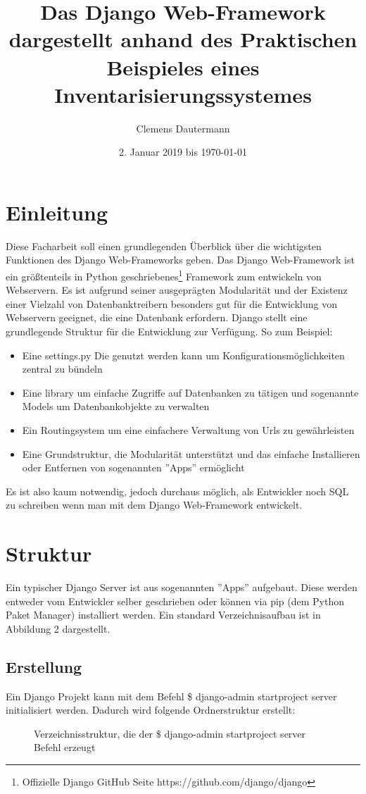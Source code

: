 \documentclass{article}
\title{Das Django Web-Framework dargestellt anhand des Praktischen Beispieles eines Inventarisierungssystemes}
\author{Clemens Dautermann}
\date{2. Januar 2019 bis \today}
\begin{document}
\maketitle
\newpage
\tableofcontents
\newpage


\section{Einleitung}
Diese Facharbeit soll einen grundlegenden Überblick über die wichtigsten Funktionen des Django Web-Frameworks geben.\newline
Das Django Web-Framework ist ein größtenteils in Python geschriebenes\footnote{Offizielle Django GitHub Seite https://github.com/django/django} Framework
zum entwickeln von Webservern. Es ist aufgrund seiner ausgeprägten Modularität und der Existenz einer Vielzahl von Datenbanktreibern besonders gut für
die Entwicklung von Webservern geeignet, die eine Datenbank erfordern.\newline 
Django stellt eine grundlegende Struktur für die Entwicklung zur Verfügung. So zum Beispiel:
\begin{itemize}
	\item Eine settings.py Die genutzt werden kann um Konfigurationsmöglichkeiten zentral zu bündeln
	\item Eine library um einfache Zugriffe auf Datenbanken zu tätigen und sogenannte Models um Datenbankobjekte zu verwalten
	\item Ein Routingsystem um eine einfachere Verwaltung von Urls zu gewährleisten
	\item Eine Grundstruktur, die Modularität unterstützt und das einfache Installieren oder Entfernen von sogenannten ''Apps'' ermöglicht
\end{itemize}
Es ist also kaum notwendig, jedoch durchaus möglich, als Entwickler noch SQL zu schreiben wenn man mit dem Django Web-Framework entwickelt.

\section{Struktur}
Ein typischer Django Server ist aus sogenannten ''Apps'' aufgebaut. Diese werden entweder vom Entwickler selber geschrieben oder können via pip (dem Python Paket Manager) installiert werden. Ein standard Verzeichnisaufbau ist in Abbildung 2 dargestellt.
\subsection{Erstellung}
Ein Django Projekt kann mit dem Befehl \$ django-admin startproject server initialisiert werden. Dadurch wird folgende Ordnerstruktur erstellt:
\begin{figure}[H]
\caption{Verzeichnisstruktur, die der \$ django-admin startproject server Befehl erzeugt}
\end{figure}
\end{document}
